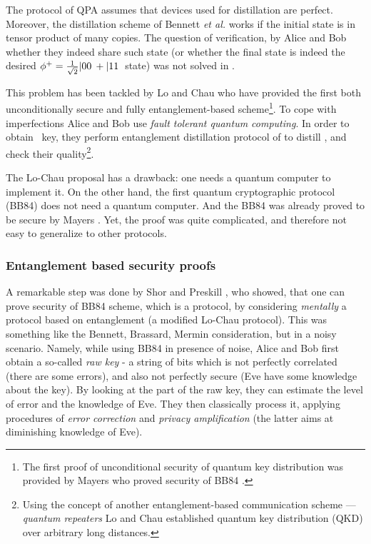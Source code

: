 \documentclass[rmp,12pt,preprint]{revtex4-2}
\begin{document}
The protocol of QPA assumes that devices used for distillation are
perfect. Moreover, the distillation scheme of Bennett \emph{et al.}
works if the initial state is in tensor product of many copies. The
question of verification, by Alice and Bob whether they indeed share
such state (or whether the final state is indeed the desired
$\phi^+={1\over \sqrt2}|00\>+|11\>$
state) was not solved in \cite{QPA}.

This problem has been tackled by Lo and Chau \cite{Lo-Chau} who have
provided the first both unconditionally secure and fully
entanglement-based scheme\footnote{The first proof of unconditional security of quantum key distribution was provided by Mayers who proved security of BB84 \cite{Mayers84proof}.}.
To cope with imperfections Alice and Bob use {\it fault tolerant quantum
  computing}. In order to obtain \secure\ key, they perform
entanglement distillation protocol of \cite{BDSW1996} to distill
\singlets, and check their quality\footnote{Using the concept of
  another entanglement-based communication scheme --- {\it quantum
    repeaters} \cite{repeatersPRL,repeaters} Lo and Chau established
  quantum key distribution (QKD) over arbitrary long distances.}.

The Lo-Chau proposal has a drawback: one needs a quantum
computer to implement it. On the other hand, the first quantum
cryptographic protocol (BB84) does not need a quantum computer. And
the BB84 was already proved to be secure by Mayers
\cite{Mayers84proof}. Yet, the proof was quite complicated, and
therefore not easy to generalize to other protocols.

\subsubsection{Entanglement based security proofs}

A remarkable step was done by Shor and Preskill \cite{ShorPreskill},
who showed, that one can prove security of BB84 scheme, which is a
\pmp protocol, by considering {\it mentally} a protocol based on
entanglement (a modified Lo-Chau protocol). This was something like
the Bennett, Brassard, Mermin consideration, but in a noisy
scenario. Namely, while using BB84 in presence of noise, Alice and Bob
first obtain a so-called {\it raw key} - a string of bits which is not
perfectly correlated (there are some errors),
and also not perfectly secure (Eve have some knowledge about the key). By looking at
the part of the raw key,  they can estimate
the level of error and the knowledge of Eve.
They then classically process
it, applying procedures of {\it error correction} and {\it privacy
amplification} (the latter aims at diminishing knowledge of Eve).
\end{document}
